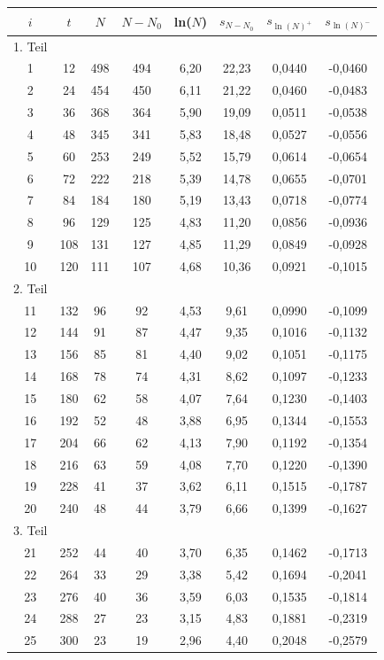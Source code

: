 \renewcommand{\arraystretch}{0.97}
\begin{table}[H]
 \begin{tabular}{c|c|c|c|c|c|c|c}
 $i$ & $t$ & $N$ & $N-N_0$ & ln($N$) & $s_{N-N_0}$& $s_{\ln(N)^+}$ & $s_{\ln(N)^-}$ \\
 \hline
1. Teil\\
 \hline
1&	12&	498&	494&	6,20&	22,23&	0,0440&	-0,0460\\
2&	24&	454&	450&	6,11&	21,22&	0,0460&	-0,0483\\
3&	36&	368&	364&	5,90&	19,09&	0,0511&	-0,0538\\
4&	48&	345&	341&	5,83&	18,48&	0,0527&	-0,0556\\
5&	60&	253&	249&	5,52&	15,79&	0,0614&	-0,0654\\
6&	72&	222&	218&	5,39&	14,78&	0,0655&	-0,0701\\
7&	84&	184&	180&	5,19&	13,43&	0,0718&	-0,0774\\
8&	96&	129&	125&	4,83&	11,20&	0,0856&	-0,0936\\
9&	108&	131&	127&	4,85&	11,29&	0,0849&	-0,0928\\
10&	120&	111&	107&	4,68&	10,36&	0,0921&	-0,1015\\
\hline
2. Teil\\
\hline
11&	132&	96&	92&	4,53&	9,61&	0,0990&	-0,1099\\
12&	144&	91&	87&	4,47&	9,35&	0,1016&	-0,1132\\
13&	156&	85&	81&	4,40&	9,02&	0,1051&	-0,1175\\
14&	168&	78&	74&	4,31&	8,62&	0,1097&	-0,1233\\
15&	180&	62&	58&	4,07&	7,64&	0,1230&	-0,1403\\
16&	192&	52&	48&	3,88&	6,95&	0,1344&	-0,1553\\
17&	204&	66&	62&	4,13&	7,90&	0,1192&	-0,1354\\
18&	216&	63&	59&	4,08&	7,70&	0,1220&	-0,1390\\
19&	228&	41&	37&	3,62&	6,11&	0,1515&	-0,1787\\
20&	240&	48&	44&	3,79&	6,66&	0,1399&	-0,1627\\
\hline
3. Teil\\
\hline
21&	252&	44&	40&	3,70&	6,35&	0,1462&	-0,1713\\
22&	264&	33&	29&	3,38&	5,42&	0,1694&	-0,2041\\
23&	276&	40&	36&	3,59&	6,03&	0,1535&	-0,1814\\
24&	288&	27&	23&	3,15&	4,83&	0,1881&	-0,2319\\
25&	300&	23&	19&	2,96&	4,40&	0,2048&	-0,2579\\

\end{tabular}
\end{table}

